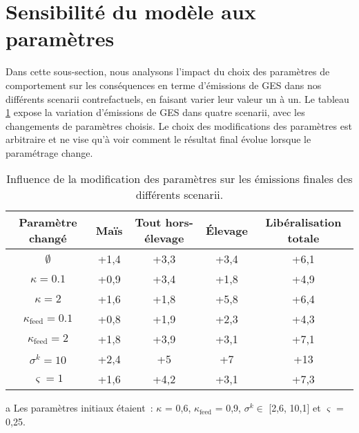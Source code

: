 \section{Sensibilité du modèle aux paramètres}

Dans cette sous-section, nous analysons l'impact du choix des paramètres de comportement sur les conséquences en terme d'émissions de GES dans nos différents scenarii contrefactuels, en faisant varier leur valeur un à un. Le tableau \ref{tab:sensibilite_param} expose la variation d'émissions de GES dans quatre scenarii, avec les changements de paramètres choisis. Le choix des modifications des paramètres est arbitraire et ne vise qu'à voir comment le résultat final évolue lorsque le paramétrage change.

\begin{table}[hbt!]
    \centering
    \caption{Influence de la modification des paramètres sur les émissions finales des différents scenarii.}
    \label{tab:sensibilite_param}
    \begin{tabular}{c|cccc}
        \hline
        Paramètre changé           & Maïs & Tout hors-élevage & Élevage & Libéralisation totale \\ \hline
        $\emptyset$\tnote{a}       & +1,4 & +3,3              & +3,4    & +6,1                  \\
        $\kappa = 0.1$             & +0,9 & +3,4              & +1,8    & +4,9                  \\
        $\kappa = 2$               & +1,6 & +1,8              & +5,8    & +6,4                  \\
        $\kappa_\text{feed} = 0.1$ & +0,8 & +1,9              & +2,3    & +4,3                  \\
        $\kappa_\text{feed} = 2$   & +1,8 & +3,9              & +3,1    & +7,1                  \\
        $\sigma^k = 10$            & +2,4 & +5                & +7      & +13                   \\
        $\varsigma = 1$            & +1,6 & +4,2              & +3,1    & +7,3                  \\
        \hline
    \end{tabular}%
    \begin{tablenotes}
        \footnotesize
        \item[a] Les paramètres initiaux étaient~: $\kappa$ = 0,6, $\kappa_\text{feed}$ = 0,9, $\sigma^k \in$ [2,6, 10,1] et $\varsigma$ = 0,25.
    \end{tablenotes}
\end{table}

